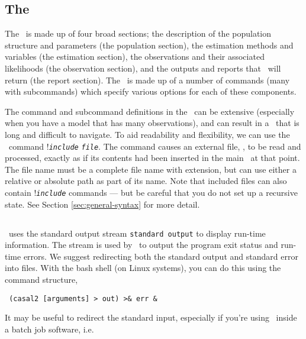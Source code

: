 \subsection{The \config\label{sec:config-files}}
The \config\ is made up of four broad sections; the description of the population structure and parameters (the population section), the estimation methods and variables (the estimation section), the observations and their associated likelihoods (the observation section), and the outputs and reports that \CNAME\ will return (the report section). The \config\ is made up of a number of commands (many with subcommands) which specify various options for each of these components.

The command and subcommand definitions in the \config\ can be extensive (especially when you have a model that has many observations), and can result in a \config\ that is long and difficult to navigate. To aid readability and flexibility, we can use the \config\ command !\texttt{\emph{include}} \texttt{\emph{file}}. The command causes an external file, , to be read and processed, exactly as if its contents had been inserted in the main \config\ at that point. The file name must be a complete file name with extension, but can use either a relative or absolute path as part of its name. Note that included files can also contain !\texttt{\emph{include}} commands --- but be careful that you do not set up a recursive state. See Section \ref{sec:general-syntax} for more detail.

\subsection{\label{sec:redirecting-stdout}}
\CNAME\ uses the standard output stream \texttt{standard output} to display run-time information. The  stream is used by \CNAME\ to output the program exit status and run-time errors. We suggest redirecting both the standard output and standard error into files. With the bash shell (on Linux systems), you can do this using the command structure,

\begin{verbatim} (casal2 [arguments] > out) >& err &\end{verbatim}

It may be useful to redirect the standard input, especially if you're using \CNAME\ inside a batch job software, i.e. 

